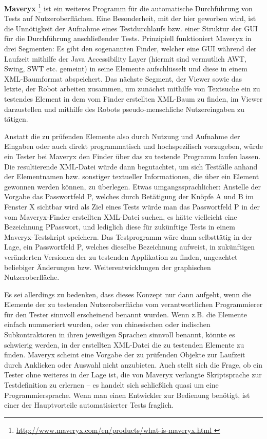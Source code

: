 \vspace{0.5cm}

\textbf{Maveryx} \footnote{\url{ http://www.maveryx.com/en/products/what-is-maveryx.html }} 
ist ein weiteres Programm für die automatische Durchführung von Tests auf Nutzeroberflächen.
Eine Besonderheit, mit der hier geworben wird, ist die Unnötigkeit der Aufnahme
eines Testdurchlaufs bzw. einer Struktur der GUI für die Durchführung anschließender
Tests. Prinzipiell funktioniert Maveryx in drei Segmenten: Es gibt den sogenannten
\glqq{}Finder\grqq{}, welcher eine GUI während der Laufzeit mithilfe der
\glqq{}Java Accessibility Layer\grqq{} (hiermit sind vermutlich AWT, Swing, SWT etc. gemeint)
in seine Elemente aufschlüsselt und diese in einem XML-Baumformat abspeichert.
Das nächste Segment, der \glqq{}Viewer\grqq{} sowie das letzte, der \glqq{}Robot\grqq{}
arbeiten zusammen, um zunächst mithilfe von Textsuche ein zu testendes Element in
dem vom Finder erstellten XML-Baum zu finden, im Viewer darzustellen und mithilfe
des Robots pseudo-menschliche Nutzereingaben zu tätigen.

Anstatt die zu prüfenden Elemente also durch Nutzung und Aufnahme der Eingaben
oder auch direkt programmatisch und hochspezifisch vorzugeben, würde ein Tester bei
Maveryx den Finder über das zu testende Programm laufen lassen. Die resultierende
XML-Datei würde dann begutachtet, um sich Testfälle anhand der Elementnamen bzw. sonstiger
textueller Informationen, die über ein Element gewonnen werden können, zu überlegen.
Etwas umgangssprachlicher: Anstelle der Vorgabe \glqq{}das Passwortfeld P, welches
durch Betätigung der Knöpfe A und B im Fenster X sichtbar wird\grqq{} als Ziel
eines Tests würde man das Passwortfeld P in der vom Maveryx-Finder erstellten
XML-Datei suchen, es hätte vielleicht eine Bezeichnung \glqq{}PPasswort\grqq{},
und lediglich diese für zukünftige Tests in einem Maveryx-Testskript speichern.
Das Testprogramm wäre dann selbsttätig in der Lage, ein Passwortfeld P,
welches dieselbe Bezeichnung aufweist, in zukünftigen veränderten Versionen
der zu testenden Applikation zu finden, ungeachtet beliebiger Änderungen bzw.
Weiterentwicklungen der graphischen Nutzeroberfläche.

Es sei allerdings zu bedenken, dass dieses Konzept nur dann aufgeht, wenn
die Elemente der zu testenden Nutzeroberfläche vom verantwortlichen Programmierer
für den Tester sinnvoll erscheinend benannt wurden. Wenn z.B. die Elemente
einfach nummeriert wurden, oder von chinesischen oder indischen Subkontraktoren
in ihren jeweiligen Sprachen sinnvoll benannt, könnte es schwierig werden,
in der erstellten XML-Datei die zu testenden Elemente zu finden. Maveryx scheint
eine Vorgabe der zu prüfenden Objekte zur Laufzeit durch Anklicken oder
Auswahl nicht anzubieten. Auch stellt sich die Frage, ob ein Tester ohne weiteres
in der Lage ist, die von Maveryx verlangte Skriptsprache zur Testdefinition
zu erlernen -- es handelt sich schließlich quasi um eine Programmiersprache.
Wenn man einen Entwickler zur Bedienung benötigt, ist einer der Hauptvorteile
automatisierter Tests fraglich.

